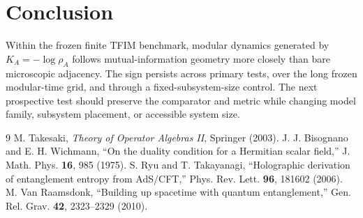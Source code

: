 \documentclass[11pt,a4paper]{article}
\begin{document}
\section{Conclusion}
Within the frozen finite TFIM benchmark, modular dynamics generated by $K_A=-\log\rho_A$ follows mutual-information geometry more closely than bare microscopic adjacency. The sign persists across primary tests, over the long frozen modular-time grid, and through a fixed-subsystem-size control. The next prospective test should preserve the comparator and metric while changing model family, subsystem placement, or accessible system size.
\begin{thebibliography}{9}
 M. Takesaki, \emph{Theory of Operator Algebras II}, Springer (2003).
 J. J. Bisognano and E. H. Wichmann, ``On the duality condition for a Hermitian scalar field,'' J. Math. Phys. \textbf{16}, 985 (1975).
 S. Ryu and T. Takayanagi, ``Holographic derivation of entanglement entropy from AdS/CFT,'' Phys. Rev. Lett. \textbf{96}, 181602 (2006).
 M. Van Raamsdonk, ``Building up spacetime with quantum entanglement,'' Gen. Rel. Grav. \textbf{42}, 2323--2329 (2010).
\end{thebibliography}
\end{document}
